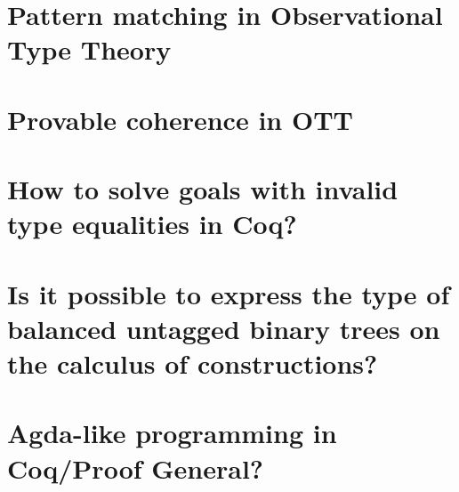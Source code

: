 \documentclass{book}%
\begin{document}
\section{Pattern matching in Observational Type Theory}


\section{Provable coherence in OTT}


\section{How to solve goals with invalid type equalities in Coq?}


\section{Is it possible to express the type of balanced untagged binary trees on the calculus of constructions?}


\section{Agda-like programming in Coq/Proof General?}

\end{document}
